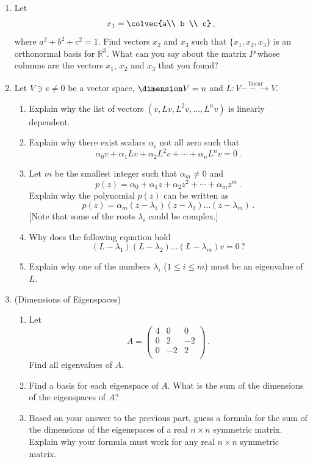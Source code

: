 \begin{enumerate}


\item Let \[x_1=\colvec{a\\ b \\ c}\, ,\] where $a^2+b^2+c^2=1$.  Find vectors $x_2$ and $x_3$ such that $\{x_1,x_2,x_3\}$ is an orthonormal basis for $\mathbb{R}^3$. What can you say about the matrix $P$ whose columns are the vectors $x_1$, $x_2$ and $x_3$ that you found?

\item\label{atleastone} Let $V\ni v\neq0$ be a vector space, $\dimension V=n$ and $L:V\stackrel{\textrm{linear}}{-\!\!-\!\!\!\longrightarrow}V$.
\begin{enumerate}
\item Explain why the list of vectors $(v,Lv,L^2v,\ldots,L^n v)$ is linearly dependent.
\item Explain why there exist scalars $\alpha_i$ not all zero such that
\[
\alpha_0 v + \alpha_1 L v+\alpha_2 L^2 v+\cdots + \alpha_n L^n v=0\, .
\]
\item Let $m$ be the smallest integer such that $\alpha_m\neq0$ and \[p(z)=\alpha_0+ \alpha_1 z + \alpha_2 z^2+\cdots + \alpha_m z^m \, .\]
Explain why the polynomial $p(z)$ can be written as
\[
p(z)=\alpha_m (z-\lambda_1)(z-\lambda_2)\ldots(z-\lambda_{m})\, .
\]
[Note that some of the roots $\lambda_i$ could be complex.]
\item Why does the following equation hold
\[
(L-\lambda_1)(L-\lambda_2)\ldots(L-\lambda_{m})
 v=0\, ?
\]
\item Explain why one of the numbers $\lambda_i$ ($1\leq i\leq m$) must be an eigenvalue of $L$.
\end{enumerate}




\item (Dimensions of Eigenspaces) \begin{enumerate}
\item Let \[A=
\begin{pmatrix}
4 & 0 & 0 \\
0 & 2 & -2 \\
0 & -2 & 2 \\
\end{pmatrix}\, .\]
Find all eigenvalues of \(A.\)
\item Find a basis for each eigenspace of \(A.\)  What is the sum of the dimensions of the eigenspaces of \(A\)?
\item Based on your answer to the previous part, guess a formula for the sum of the dimensions of the eigenspaces of a real \(n \times n\) symmetric matrix. Explain why your formula must work for any real \(n \times n\) symmetric matrix.
\end{enumerate}





\end{enumerate}
